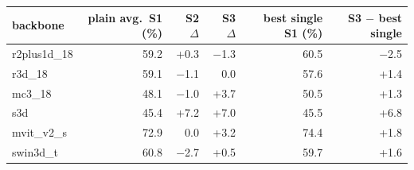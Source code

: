 \begin{tabular}{@{}l rrr rr@{}}\toprule
backbone & plain avg.\ S1 (\%) & S2 $\Delta$ & S3 $\Delta$ & best single S1 (\%) & S3 $-$ best single\\\midrule
r2plus1d\_18 & 59.2 & +0.3 & $-$1.3 & 60.5 & $-$2.5\\
r3d\_18 & 59.1 & $-$1.1 & 0.0 & 57.6 & +1.4\\
mc3\_18 & 48.1 & $-$1.0 & +3.7 & 50.5 & +1.3\\
s3d & 45.4 & +7.2 & +7.0 & 45.5 & +6.8\\
mvit\_v2\_s & 72.9 & 0.0 & +3.2 & 74.4 & +1.8\\
swin3d\_t & 60.8 & $-$2.7 & +0.5 & 59.7 & +1.6\\
\bottomrule\end{tabular}